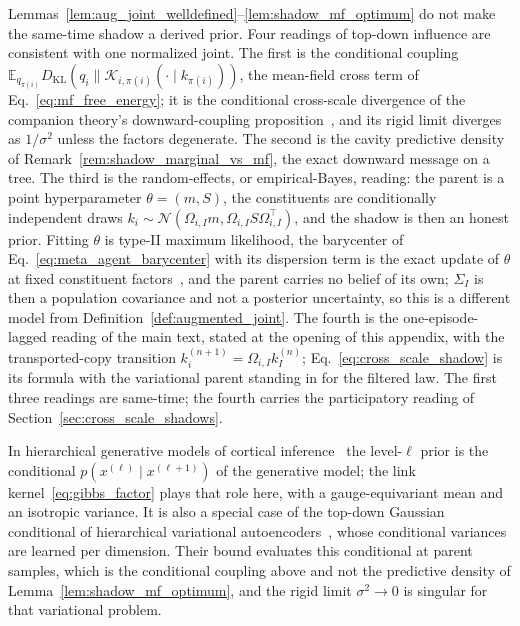 Lemmas~\ref{lem:aug_joint_welldefined}--\ref{lem:shadow_mf_optimum} do not make the same-time shadow a derived prior. Four readings of top-down influence are consistent with one normalized joint. The first is the conditional coupling $\mathbb{E}_{q_{\pi(i)}} D_{\mathrm{KL}}(q_i\|\mathcal{K}_{i,\pi(i)}(\cdot \mid k_{\pi(i)}))$, the mean-field cross term of Eq.~\eqref{eq:mf_free_energy}; it is the conditional cross-scale divergence of the companion theory's downward-coupling proposition~\cite[Ch.~12]{DennisGaugeVFE2026}, and its rigid limit diverges as $1/\sigma^2$ unless the factors degenerate. The second is the cavity predictive density of Remark~\ref{rem:shadow_marginal_vs_mf}, the exact downward message on a tree. The third is the random-effects, or empirical-Bayes, reading: the parent is a point hyperparameter $\theta = (m, S)$, the constituents are conditionally independent draws $k_i \sim \mathcal{N}(\Omega_{i,I} m, \Omega_{i,I} S \Omega_{i,I}^\top)$, and the shadow is then an honest prior. Fitting $\theta$ is type-II maximum likelihood, the barycenter of Eq.~\eqref{eq:meta_agent_barycenter} with its dispersion term is the exact update of $\theta$ at fixed constituent factors~\cite{Neal1998}, and the parent carries no belief of its own; $\Sigma_I$ is then a population covariance and not a posterior uncertainty, so this is a different model from Definition~\ref{def:augmented_joint}. The fourth is the one-episode-lagged reading of the main text, stated at the opening of this appendix, with the transported-copy transition $k_i^{(n+1)} = \Omega_{i,I} k_I^{(n)}$; Eq.~\eqref{eq:cross_scale_shadow} is its formula with the variational parent standing in for the filtered law. The first three readings are same-time; the fourth carries the participatory reading of Section~\ref{sec:cross_scale_shadows}.

In hierarchical generative models of cortical inference~\cite{friston2008hierarchical, parr2022active} the level-$\ell$ prior is the conditional $p(x^{(\ell)} \mid x^{(\ell+1)})$ of the generative model; the link kernel~\eqref{eq:gibbs_factor} plays that role here, with a gauge-equivariant mean and an isotropic variance. It is also a special case of the top-down Gaussian conditional of hierarchical variational autoencoders~\cite{Sonderby2016}, whose conditional variances are learned per dimension. Their bound evaluates this conditional at parent samples, which is the conditional coupling above and not the predictive density of Lemma~\ref{lem:shadow_mf_optimum}, and the rigid limit $\sigma^2 \to 0$ is singular for that variational problem.


